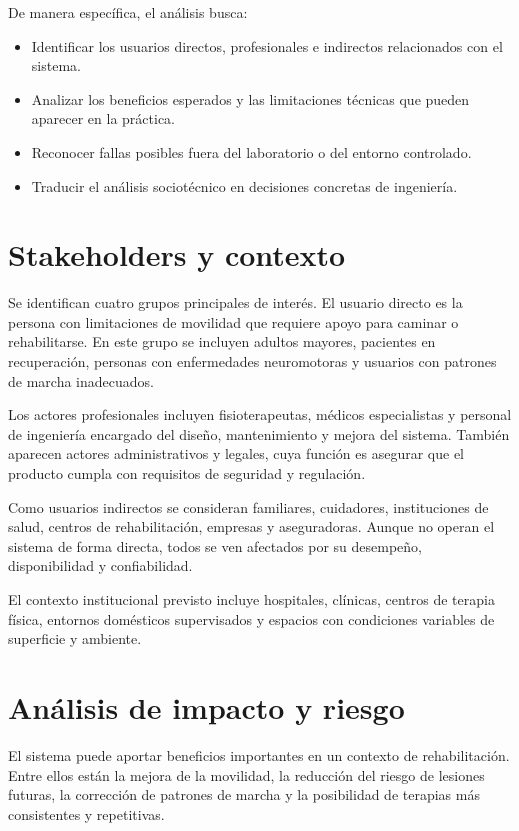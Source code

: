 \documentclass[letterpaper,12pt]{article}
\begin{document}
De manera específica, el análisis busca:

\begin{itemize}
    \item Identificar los usuarios directos, profesionales e indirectos relacionados con el sistema.
    \item Analizar los beneficios esperados y las limitaciones técnicas que pueden aparecer en la práctica.
    \item Reconocer fallas posibles fuera del laboratorio o del entorno controlado.
    \item Traducir el análisis sociotécnico en decisiones concretas de ingeniería.
\end{itemize}

\section{Stakeholders y contexto}

Se identifican cuatro grupos principales de interés. El usuario directo es la persona con limitaciones de movilidad que requiere apoyo para caminar o rehabilitarse. En este grupo se incluyen adultos mayores, pacientes en recuperación, personas con enfermedades neuromotoras y usuarios con patrones de marcha inadecuados.

Los actores profesionales incluyen fisioterapeutas, médicos especialistas y personal de ingeniería encargado del diseño, mantenimiento y mejora del sistema. También aparecen actores administrativos y legales, cuya función es asegurar que el producto cumpla con requisitos de seguridad y regulación.

Como usuarios indirectos se consideran familiares, cuidadores, instituciones de salud, centros de rehabilitación, empresas y aseguradoras. Aunque no operan el sistema de forma directa, todos se ven afectados por su desempeño, disponibilidad y confiabilidad.

El contexto institucional previsto incluye hospitales, clínicas, centros de terapia física, entornos domésticos supervisados y espacios con condiciones variables de superficie y ambiente.

\section{Análisis de impacto y riesgo}

El sistema puede aportar beneficios importantes en un contexto de rehabilitación. Entre ellos están la mejora de la movilidad, la reducción del riesgo de lesiones futuras, la corrección de patrones de marcha y la posibilidad de terapias más consistentes y repetitivas.
\end{document}
